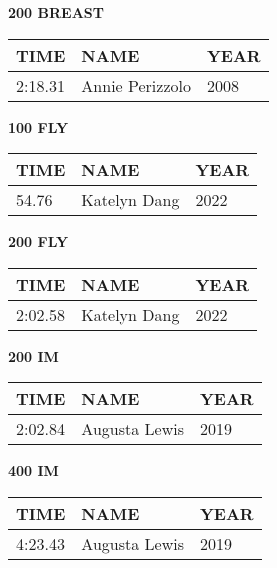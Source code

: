 \begin{table}[H]
\centering
\begin{minipage}[t]{0.48\textwidth}
\centering
\textbf{200 BREAST}\\[0.1cm]
\begin{tabular}{@{}p{1.8cm}p{2.8cm}p{1.2cm}@{}}
\hline
    \textbf{TIME} & \textbf{NAME} & \textbf{YEAR} \\
\hline
    2:18.31 & Annie Perizzolo & 2008 \\
\hline
\end{tabular}
\end{minipage}\hfill
\begin{minipage}[t]{0.48\textwidth}
\centering
\textbf{100 FLY}\\[0.1cm]
\begin{tabular}{@{}p{1.8cm}p{2.8cm}p{1.2cm}@{}}
\hline
    \textbf{TIME} & \textbf{NAME} & \textbf{YEAR} \\
\hline
    54.76 & Katelyn Dang & 2022 \\
\hline
\end{tabular}
\end{minipage}
\end{table}

\begin{table}[H]
\centering
\begin{minipage}[t]{0.48\textwidth}
\centering
\textbf{200 FLY}\\[0.1cm]
\begin{tabular}{@{}p{1.8cm}p{2.8cm}p{1.2cm}@{}}
\hline
    \textbf{TIME} & \textbf{NAME} & \textbf{YEAR} \\
\hline
    2:02.58 & Katelyn Dang & 2022 \\
\hline
\end{tabular}
\end{minipage}\hfill
\begin{minipage}[t]{0.48\textwidth}
\centering
\textbf{200 IM}\\[0.1cm]
\begin{tabular}{@{}p{1.8cm}p{2.8cm}p{1.2cm}@{}}
\hline
    \textbf{TIME} & \textbf{NAME} & \textbf{YEAR} \\
\hline
    2:02.84 & Augusta Lewis & 2019 \\
\hline
\end{tabular}
\end{minipage}
\end{table}

\begin{table}[H]
\centering
\begin{minipage}[t]{0.6\textwidth}
\centering
\textbf{400 IM}\\[0.1cm]
\begin{tabular}{@{}p{1.8cm}p{2.8cm}p{1.2cm}@{}}
\hline
    \textbf{TIME} & \textbf{NAME} & \textbf{YEAR} \\
\hline
    4:23.43 & Augusta Lewis & 2019 \\
\hline
\end{tabular}
\end{minipage}
\end{table}

